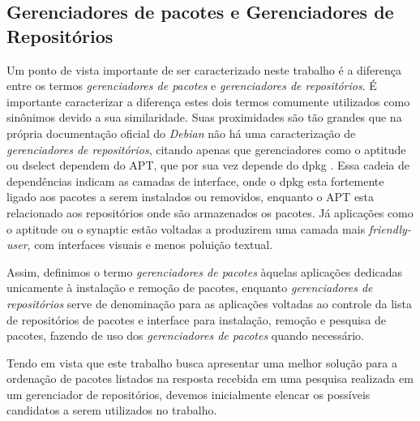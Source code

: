 
\subsection{Gerenciadores de pacotes e Gerenciadores de Repositórios} %
\label{sec:gerenciadores}


Um ponto de vista importante de ser caracterizado neste trabalho é a diferença entre os termos \textit{ gerenciadores de pacotes} e \textit{gerenciadores de repositórios}.
É importante caracterizar a diferença estes dois termos comumente utilizados como sinônimos devido a sua similaridade. Suas proximidades são tão grandes que na própria documentação oficial do \textit{Debian} não há uma caracterização de \textit{gerenciadores de repositórios}, citando apenas que gerenciadores como o {\code aptitude} ou {\code dselect} dependem do {\code APT}, que por sua vez depende do {\code dpkg} \cite{debian-faq}. Essa cadeia de dependências indicam as camadas de interface, onde o {\code dpkg} esta fortemente ligado aos pacotes a serem instalados ou removidos, enquanto o {\code APT} esta relacionado aos repositórios onde são armazenados os pacotes. Já aplicações como o {\code aptitude} ou o {\code synaptic} estão voltadas a produzirem uma camada mais \textit{friendly-user}, com interfaces visuais e menos poluição textual.

Assim, definimos o termo \textit{gerenciadores de pacotes} àquelas aplicações dedicadas unicamente à instalação e remoção de pacotes, enquanto \textit{gerenciadores de repositórios} serve de denominação para as aplicações voltadas ao controle da lista de repositórios de pacotes e interface  para instalação, remoção e pesquisa de pacotes, fazendo de uso dos \textit{gerenciadores de pacotes} quando necessário.

Tendo em vista que este trabalho busca apresentar uma melhor solução para a ordenação de pacotes listados na resposta recebida em uma pesquisa realizada em um gerenciador de repositórios, devemos inicialmente elencar os possíveis candidatos a serem utilizados no trabalho.


